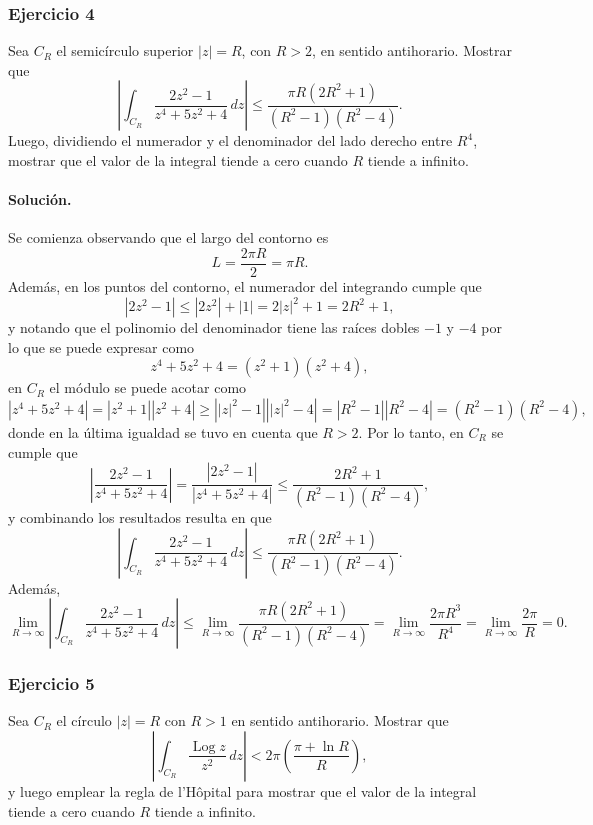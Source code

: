 \documentclass[a4paper]{report}
\DeclareMathOperator{\Log}{Log}
\begin{document}
\subsubsection{Ejercicio 4}

Sea \(C_R\) el semicírculo superior \(|z|=R\), con \(R>2\), en sentido antihorario. Mostrar que 
\[
 \left|\int_{C_R}\frac{2z^2-1}{z^4+5z^2+4}\,dz\right|\leq\frac{\pi R(2R^2+1)}{(R^2-1)(R^2-4)}.
\]
Luego, dividiendo el numerador y el denominador del lado derecho entre \(R^4\), mostrar que el valor de la integral tiende a cero cuando \(R\) tiende a infinito.

\paragraph{Solución.} Se comienza observando que el largo del contorno es
\[
 L=\frac{2\pi R}{2}=\pi R.
\]
Además, en los puntos del contorno, el numerador del integrando cumple que 
\[
 |2z^2-1|\leq|2z^2|+|1|=2|z|^2+1=2R^2+1,
\]
y notando que el polinomio del denominador tiene las raíces dobles \(-1\) y \(-4\) por lo que se puede expresar como
\[
 z^4+5z^2+4=(z^2+1)(z^2+4),
\]
en \(C_R\) el módulo se puede acotar como
\[
 |z^4+5z^2+4|=|z^2+1||z^2+4|\geq\left||z|^2-1\right|\left||z|^2-4\right|=|R^2-1||R^2-4|=(R^2-1)(R^2-4),
\]
donde en la última igualdad se tuvo en cuenta que \(R>2\). Por lo tanto, en \(C_R\) se cumple que 
\[
 \left|\frac{2z^2-1}{z^4+5z^2+4}\right|=\frac{|2z^2-1|}{|z^4+5z^2+4|}\leq\frac{2R^2+1}{(R^2-1)(R^2-4)},
\]
y combinando los resultados resulta en que
\[
 \left|\int_{C_R}\frac{2z^2-1}{z^4+5z^2+4}\,dz\right|\leq\frac{\pi R(2R^2+1)}{(R^2-1)(R^2-4)}.
\]
Además, 
\[
 \lim_{R\to\infty}\left|\int_{C_R}\frac{2z^2-1}{z^4+5z^2+4}\,dz\right|\leq\lim_{R\to\infty}\frac{\pi R(2R^2+1)}{(R^2-1)(R^2-4)}=\lim_{R\to\infty}\frac{2\pi R^3}{R^4}=\lim_{R\to\infty}\frac{2\pi}{R}=0.
\]

\subsubsection{Ejercicio 5}

Sea \(C_R\) el círculo \(|z|=R\) con \(R>1\) en sentido antihorario. Mostrar que 
\[
 \left|\int_{C_R}\frac{\Log z}{z^2}\,dz\right|<2\pi\left(\frac{\pi+\ln R}{R}\right),
\]
y luego emplear la regla de l'Hôpital para mostrar que el valor de la integral tiende a cero cuando \(R\) tiende a infinito.
\end{document}
